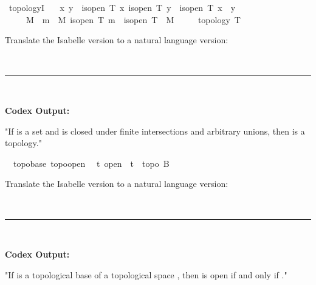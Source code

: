 \documentclass{article}
\begin{document}
\begin{boxB}
\begin{isabelle}
\isamarkupfalse \ topologyI{\isacharcolon}{\kern0pt}\isanewline
\ \ {\isachardoublequoteopen}{\isasymlbrakk}{\isasymAnd}\ x\ y{\isachardot}{\kern0pt}\ {\isasymlbrakk}\ is{\isacharunderscore}{\kern0pt}open\ T\ x{\isacharsemicolon}{\kern0pt}\ is{\isacharunderscore}{\kern0pt}open\ T\ y{\isasymrbrakk}\ {\isasymLongrightarrow}\ is{\isacharunderscore}{\kern0pt}open\ T\ {\isacharparenleft}{\kern0pt}x\ {\isasyminter}\ y{\isacharparenright}{\kern0pt}{\isacharsemicolon}{\kern0pt}\isanewline
\ \ \ \ {\isasymAnd}\ M{\isachardot}{\kern0pt}\ {\isasymforall}\ m\ {\isasymin}\ M{\isachardot}{\kern0pt}\ is{\isacharunderscore}{\kern0pt}open\ T\ m\ {\isasymLongrightarrow}\ is{\isacharunderscore}{\kern0pt}open\ T\ {\isacharparenleft}{\kern0pt}{\isasymUnion}\ M{\isacharparenright}{\kern0pt}\isanewline
\ \ \ {\isasymrbrakk}\ {\isasymLongrightarrow}\ topology\ T{\isachardoublequoteclose}
\end{isabelle}
Translate the Isabelle version to a natural language version:

\
\hrule
\

\textbf{Codex Output:}

"If  is a set and  is closed under finite intersections and arbitrary unions, then  is a topology."
\end{boxB}

\begin{boxB}
\begin{isabelle}
\isamarkupfalse \ {\isacharparenleft}{\kern0pt}\ topobase{\isacharparenright}{\kern0pt}\ topo{\isacharunderscore}{\kern0pt}open{\isacharcolon}{\kern0pt}\isanewline
\ \ {\isachardoublequoteopen}t\ open\ {\isacharequal}{\kern0pt}\ {\isacharparenleft}{\kern0pt}t\ {\isasymin}\ topo\ B{\isacharparenright}{\kern0pt}{\isachardoublequoteclose}
\end{isabelle}
Translate the Isabelle version to a natural language version:

\
\hrule
\

\textbf{Codex Output:}

"If  is a topological base of a topological space , then  is open if and only if ."
\end{boxB}
\end{document}

